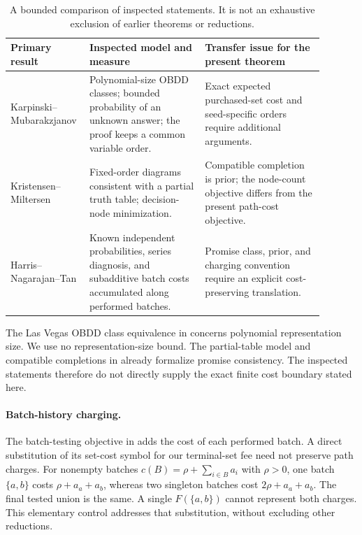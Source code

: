 \documentclass[pdflatex,sn-mathphys-num]{sn-jnl}
\theoremstyle{thmstyleone}
\theoremstyle{thmstylethree}
\theoremstyle{thmstyletwo}
\begin{document}
\begin{table}[t]
\centering\small
\setlength{\tabcolsep}{5pt}
\begin{tabular}{>{\raggedright\arraybackslash}p{0.18\linewidth}
                >{\raggedright\arraybackslash}p{0.35\linewidth}
                >{\raggedright\arraybackslash}p{0.36\linewidth}}
\toprule
Primary result & Inspected model and measure & Transfer issue for the present theorem\\
\midrule
Karpinski--Mubarakzjanov \cite{karpinski1999}
& Polynomial-size OBDD classes; bounded probability of an unknown answer;
the proof keeps a common variable order.
& Exact expected purchased-set cost and seed-specific orders require
additional arguments.\\[3pt]
Kristensen--Miltersen \cite{kristensen2006}
& Fixed-order diagrams consistent with a partial truth table;
decision-node minimization.
& Compatible completion is prior; the node-count objective differs
from the present path-cost objective.\\[3pt]
Harris--Nagarajan--Tan \cite{harris2025}
& Known independent probabilities, series diagnosis, and subadditive
batch costs accumulated along performed batches.
& Promise class, prior, and charging convention require an explicit
cost-preserving translation.\\
\bottomrule
\end{tabular}
\caption{A bounded comparison of inspected statements. It is not an
exhaustive exclusion of earlier theorems or reductions.}
\label{tab:generic-scope}
\end{table}

The Las Vegas OBDD class equivalence in \cite{karpinski1999} concerns
polynomial representation size. We use no representation-size bound.
The partial-table model and compatible completions in
\cite{kristensen2006} already formalize promise consistency.
The inspected statements therefore do not directly supply the exact
finite cost boundary stated here.

\paragraph*{Batch-history charging.}
The batch-testing objective in \cite{harris2025} adds the cost of each
performed batch. A direct substitution of its set-cost symbol for our
terminal-set fee need not preserve path charges. For nonempty batches
$c(B)=\rho+\sum_{i\in B}a_i$ with $\rho>0$, one batch $\{a,b\}$ costs
$\rho+a_a+a_b$, whereas two singleton batches cost
$2\rho+a_a+a_b$. The final tested union is the same. A single
$F(\{a,b\})$ cannot represent both charges. This elementary control
addresses that substitution, without excluding other reductions.
\end{document}
